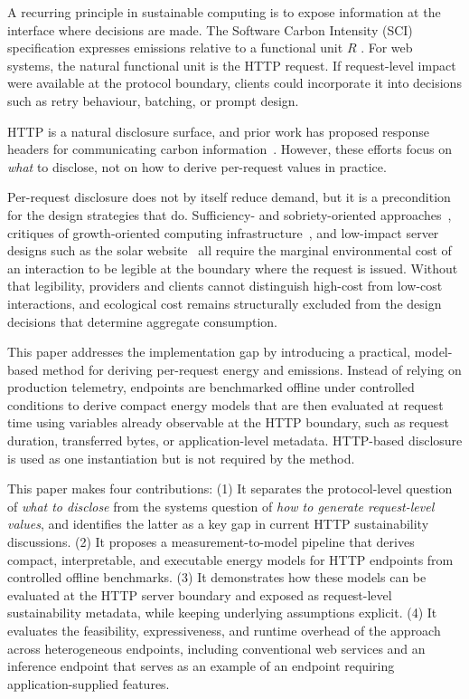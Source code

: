 \documentclass[sigconf]{acmart}
\begin{document}
A recurring principle in sustainable computing is to expose information at the
interface where decisions are made. The Software Carbon Intensity (SCI)
specification expresses emissions relative to a functional unit \(R\)
\cite{gsf-sci}. For web systems, the natural functional unit is the HTTP
request. If request-level impact were available at the protocol boundary,
clients could incorporate it into decisions such as retry behaviour, batching,
or prompt design.

HTTP is a natural disclosure surface, and prior work has proposed response headers for communicating carbon information~\cite{martin-http-carbon-emissions-scope-2-00,httpwg-admin-issue-52-carbon-emissions,ietf-http-wg-mailinglist-carbon-header-thread,besleaga-green-sustainability-header-00}. However, these efforts focus on \emph{what} to disclose, not on how to derive per-request values in practice.

Per-request disclosure does not by itself reduce demand, but it is a precondition for the design strategies that do. Sufficiency- and sobriety-oriented approaches~\cite{nardi2018computingwithinlimits,pargman2014rethinking}, critiques of growth-oriented computing infrastructure~\cite{becker2023insolvent}, and low-impact server designs such as the solar website~\cite{dedecker2018solar} all require the marginal environmental cost of an interaction to be legible at the boundary where the request is issued. Without that legibility, providers and clients cannot distinguish high-cost from low-cost interactions, and ecological cost remains structurally excluded from the design decisions that determine aggregate consumption.

This paper addresses the implementation gap by introducing a practical, model-based method for deriving per-request energy and emissions. Instead of relying on production telemetry, endpoints are benchmarked offline under controlled conditions to derive compact energy models that are then evaluated at request time using variables already observable at the HTTP boundary, such as request duration, transferred bytes, or application-level metadata. HTTP-based disclosure is used as one instantiation but is not required by the method.

This paper makes four contributions:
(1) It separates the protocol-level question of \emph{what to disclose} from the systems question of \emph{how to generate request-level values}, and
identifies the latter as a key gap in current HTTP sustainability discussions.
(2) It proposes a measurement-to-model pipeline that derives compact, interpretable, and executable energy models for HTTP endpoints from controlled
offline benchmarks.
(3) It demonstrates how these models can be evaluated at the HTTP server boundary and exposed as request-level sustainability metadata, while keeping
underlying assumptions explicit.
(4) It evaluates the feasibility, expressiveness, and runtime overhead of the approach across heterogeneous endpoints, including conventional web services
and an inference endpoint that serves as an example of an endpoint requiring application-supplied features.
\end{document}
